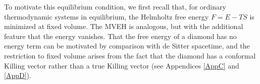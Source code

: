 \documentclass[aps,prd,twocolumn,showpacs,groupedaddress,nofootinbib,longbibliography]{revtex4-1}
\def\beq{\begin{equation}}
\def\eeq{\end{equation}}
\def\d{\delta}\def\D{\Delta}
\def\k{\kappa}
\begin{document}
To motivate this equilibrium condition,
we first recall that, 
for ordinary thermodynamic systems
in equilibrium, the Helmholtz free energy $F=E - TS$ is minimized at fixed volume.
The MVEH is analogous, but with the additional feature that the energy 
vanishes.
That the free energy of a diamond has no energy term can be motivated by 
comparison with de Sitter spacetime, and the restriction to fixed volume arises from 
the fact that the diamond has a conformal Killing vector rather than a true Killing vector (see Appendices \ref{AppC} and \ref{AppD}). 


\end{document}
